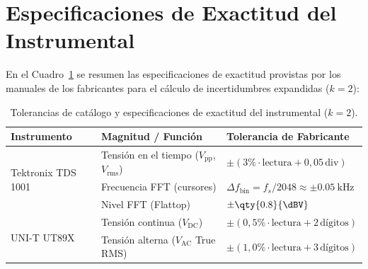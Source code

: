 \section{Especificaciones de Exactitud del Instrumental}
En el Cuadro~\ref{tab.mat:tolerancias} se resumen las especificaciones de exactitud provistas por los manuales de los
fabricantes para el cálculo de incertidumbres expandidas ($k=2$):

\begin{table}[!ht]
    \centering
    \begin{tabular}{lll}
        \toprule
        \textbf{Instrumento} & \textbf{Magnitud / Función} & \textbf{Tolerancia de Fabricante} \\
        \midrule
        \multirow{3}{*}{Tektronix TDS 1001} 
        & Tensión en el tiempo ($V_{\text{pp}}$, $V_{\text{rms}}$) & $\pm(3\% \cdot \text{lectura} + 0{,}05\,\text{div})$ \\
        & Frecuencia FFT (cursores) & $\Delta f_{\text{bin}} = f_s / 2048 \approx \pm \qty{0.05}{\kilo\hertz}$ \\
        & Nivel FFT (Flattop) & $\pm \qty{0.8}{\dBV}$ \\
        \midrule
        \multirow{2}{*}{UNI-T UT89X}
        & Tensión continua ($V_{\text{DC}}$) & $\pm(0{,}5\% \cdot \text{lectura} + 2\,\text{dígitos})$ \\
        & Tensión alterna ($V_{\text{AC}}$ True RMS) & $\pm(1{,}0\% \cdot \text{lectura} + 3\,\text{dígitos})$ \\
        \bottomrule
    \end{tabular}
    \caption{Tolerancias de catálogo y especificaciones de exactitud del instrumental ($k=2$).}
    \label{tab.mat:tolerancias}
\end{table}
